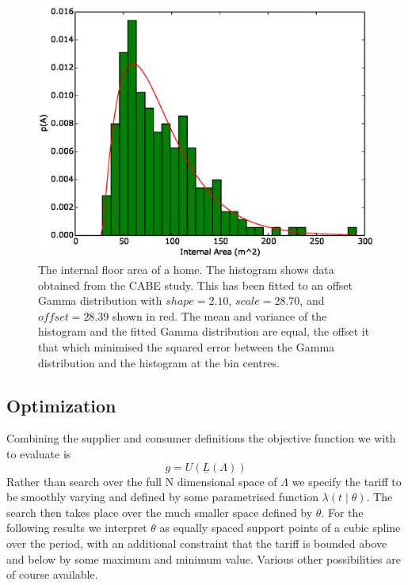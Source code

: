 \documentclass[a4paper, 10 pt, conference]{ieeeconf}  %
\begin{document}
\begin{figure}[htb]
\centering
\includegraphics[width=\columnwidth,trim =0cm 0cm 0cm 0cm,clip=True]{f3.eps}
\caption{The internal floor area of a home. The histogram shows data obtained from the CABE study. This has been fitted to an offset Gamma distribution with $shape=2.10$, $scale=28.70$, and $ offset=28.39$ shown in red. The mean and variance of the histogram and the fitted Gamma distribution are equal, the offset it that which minimised the squared error between the Gamma distribution and the histogram at the bin centres.}
\label{GIA}
\end{figure}

\subsection{Optimization}
Combining the supplier and consumer definitions the objective function we with to evaluate is
\begin{equation}
g = U(\underline{L}(\Lambda))
\end{equation}
Rather than search over the full N dimensional space of $\Lambda$ we specify the tariff to be smoothly varying and defined by some parametrised function $\lambda(t \mid \theta)$. The search then takes place over the much smaller space defined by $\theta$. For the following results we interpret $\theta$ as equally spaced support points of a cubic spline over the period, with an additional constraint that the tariff is bounded above and below by some maximum and minimum value. Various other possibilities are of course available.
\end{document}
